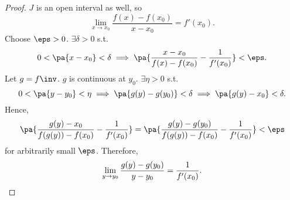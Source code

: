 \documentclass[11pt]{scrartcl}
\numberwithin{equation}{section}
\begin{document}
\begin{proof}
    $J$ is an open interval as well, so 
    \[
        \lim_{x\rightarrow x_0}\frac{f(x)-f(x_0)}{x-x_0}=f'(x_0).
    \]
    Choose $\eps>0$. $\exists \delta >0$ s.t. 
    \[
        0 < \pa{x-x_0} < \delta \implies \pa{\frac{x-x_0}{f(x)-f(x_0)}-\frac{1}{f'(x_0)}} < \eps.
    \]
    Let $g=f\inv$. $g$ is continuous at $y_0$. $\exists \eta > 0$ s.t.
    \[
        0 < \pa{y-y_0} < \eta \implies \pa{g(y)-g(y_0)} < \delta
        \implies \pa{g(y) - x_0} < \delta.
    \]
    Hence, 
    \[
        \pa{\frac{g(y)-x_0}{f(g(y)) - f(x_0)} - \frac{1}{f'(x_0)}} = \pa{\frac{g(y)-g(y_0)}{f(g(y)) - f(x_0)} - \frac{1}{f'(x_0)}} < \eps
    \]
    for arbitrarily small $\eps$. Therefore, 
    \[
        \lim_{y\rightarrow y_0}\frac{g(y)-g(y_0)}{y-y_0} = \frac{1}{f'(x_0)}. \qedhere
    \]
\end{proof}
\end{document}
